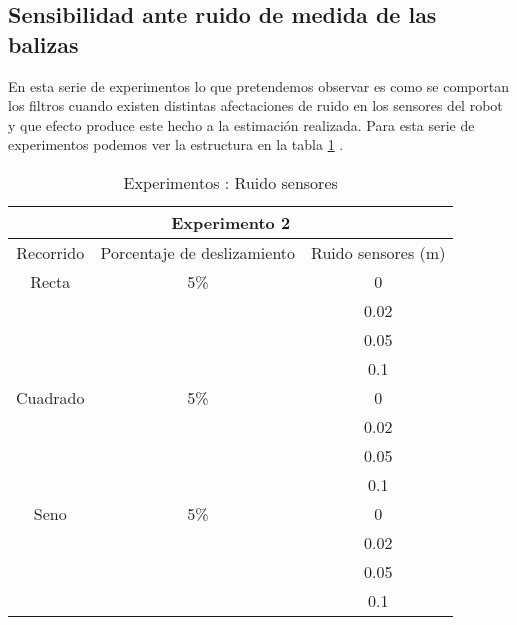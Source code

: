 \subsection{Sensibilidad ante ruido de medida de las balizas}
%
%
%
En esta serie de experimentos lo que pretendemos observar es como se comportan los filtros cuando existen distintas afectaciones de ruido en los sensores del robot y que efecto produce este hecho a la estimación realizada.
Para esta serie de experimentos podemos ver la estructura en la tabla \ref{tabla:exp_balizas} .

\begin{table}[ht!]
\caption{Experimentos : Ruido sensores}
\begin{center}
\begin{tabular}{|l|l|c|l|}
\hline
\multicolumn{ 4}{|c|}{Experimento 2} \\ \hline
\multicolumn{1}{|c|}{Recorrido} & \multicolumn{1}{c|}{Porcentaje de deslizamiento} & \multicolumn{ 2}{c|}{Ruido sensores (m)} \\ \hline
\multicolumn{ 1}{|c|}{Recta} & \multicolumn{ 1}{c|}{5\%} & \multicolumn{ 2}{c|}{0} \\ \cline{ 3- 4}
\multicolumn{ 1}{|l|}{} & \multicolumn{ 1}{l|}{} & \multicolumn{ 2}{c|}{0.02} \\ \cline{ 3- 4}
\multicolumn{ 1}{|l|}{} & \multicolumn{ 1}{l|}{} & \multicolumn{ 2}{c|}{0.05} \\ \cline{ 3- 4}
\multicolumn{ 1}{|l|}{} & \multicolumn{ 1}{l|}{} & \multicolumn{ 2}{c|}{0.1} \\ \hline
\multicolumn{ 1}{|c|}{Cuadrado} & \multicolumn{ 1}{c|}{5\%} & \multicolumn{ 2}{c|}{0} \\ \cline{ 3- 4}
\multicolumn{ 1}{|l|}{} & \multicolumn{ 1}{l|}{} & \multicolumn{ 2}{c|}{0.02} \\ \cline{ 3- 4}
\multicolumn{ 1}{|l|}{} & \multicolumn{ 1}{l|}{} & \multicolumn{ 2}{c|}{0.05} \\ \cline{ 3- 4}
\multicolumn{ 1}{|l|}{} & \multicolumn{ 1}{l|}{} & \multicolumn{ 2}{c|}{0.1} \\ \hline
\multicolumn{ 1}{|c|}{Seno} & \multicolumn{ 1}{c|}{5\%} & \multicolumn{ 2}{c|}{0} \\ \cline{ 3- 4}
\multicolumn{ 1}{|l|}{} & \multicolumn{ 1}{l|}{} & \multicolumn{ 2}{c|}{0.02} \\ \cline{ 3- 4}
\multicolumn{ 1}{|l|}{} & \multicolumn{ 1}{l|}{} & \multicolumn{ 2}{c|}{0.05} \\ \cline{ 3- 4}
\multicolumn{ 1}{|l|}{} & \multicolumn{ 1}{l|}{} & \multicolumn{ 2}{c|}{0.1} \\ \hline
\end{tabular}
\end{center}
\label{tabla:exp_balizas}
\end{table}

